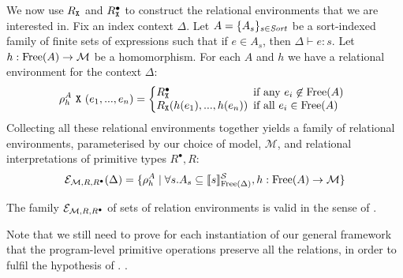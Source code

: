 We now use $R_{\textup{\texttt{X}}}$ and $R^\bullet_{\textup{\texttt{X}}}$ to
construct the relational environments that we are interested in.  Fix
an index context $\Delta$. Let $A = \{ A_s \}_{s \in \mathit{Sort}}$ be a
sort-indexed family of finite sets of expressions such that if $e \in
A_s$, then $\Delta \vdash e : s$. Let $h : \mathrm{Free}(A) \to \mathcal{M}$
be a homomorphism. For each $A$ and $h$ we have a relational
environment for the context $\Delta$:
\begin{displaymath}
  \rho^A_h\ \tyPrimNm{X}\ (e_1,...,e_n) = \left\{
    \begin{array}{@{}l@{\hspace{0.5em}}l}
      R^\bullet_{\tyPrimNm{X}} & \textrm{if any }e_i \not\in \Free(A) \\
      R_{\tyPrimNm{X}}(h(e_1),...,h(e_n)) & \textrm{if all }e_i \in \Free(A)
    \end{array}
  \right.
\end{displaymath}
Collecting all these relational environments together yields a family
of relational environments, parameterised by our choice of model,
$\mathcal{M}$, and relational interpretations of primitive types
$R^\bullet,R$:
\begin{displaymath}
  \mathcal{E}_{\mathcal{M},R,R^\bullet}(\Delta) = \{ \rho^A_h \mathrel| \forall s.A_s \subseteq \llbracket s \rrbracket^{\mathcal{S}}_{\mathrm{Free}(\Delta)}, h : \mathrm{Free}(A) \to \mathcal{M} \}
\end{displaymath}

\begin{theorem}
  The family $\mathcal{E}_{\mathcal{M},R,R^\bullet}$ of sets of
  relation environments is valid in the sense of
  .
\end{theorem}

Note that we still need to prove for each instantiation of our general
framework that the program-level primitive operations preserve all the
relations, in order to fulfil the hypothesis of
. .

